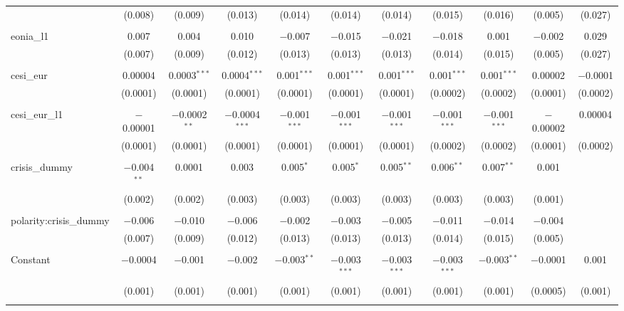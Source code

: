 \begin{table}[!htbp]
\begin{adjustbox}{width=1.35\textwidth}
\begin{tabular}{@{\extracolsep{5pt}}lcccccccccc}
  & (0.008) & (0.009) & (0.013) & (0.014) & (0.014) & (0.014) & (0.015) & (0.016) & (0.005) & (0.027) \\ 
  & & & & & & & & & & \\ 
 eonia\_l1 & 0.007 & 0.004 & 0.010 & $-$0.007 & $-$0.015 & $-$0.021 & $-$0.018 & 0.001 & $-$0.002 & 0.029 \\ 
  & (0.007) & (0.009) & (0.012) & (0.013) & (0.013) & (0.013) & (0.014) & (0.015) & (0.005) & (0.027) \\ 
  & & & & & & & & & & \\ 
 cesi\_eur & 0.00004 & 0.0003$^{***}$ & 0.0004$^{***}$ & 0.001$^{***}$ & 0.001$^{***}$ & 0.001$^{***}$ & 0.001$^{***}$ & 0.001$^{***}$ & 0.00002 & $-$0.0001 \\ 
  & (0.0001) & (0.0001) & (0.0001) & (0.0001) & (0.0001) & (0.0001) & (0.0002) & (0.0002) & (0.0001) & (0.0002) \\ 
  & & & & & & & & & & \\ 
 cesi\_eur\_l1 & $-$0.00001 & $-$0.0002$^{**}$ & $-$0.0004$^{***}$ & $-$0.001$^{***}$ & $-$0.001$^{***}$ & $-$0.001$^{***}$ & $-$0.001$^{***}$ & $-$0.001$^{***}$ & $-$0.00002 & 0.00004 \\ 
  & (0.0001) & (0.0001) & (0.0001) & (0.0001) & (0.0001) & (0.0001) & (0.0002) & (0.0002) & (0.0001) & (0.0002) \\ 
  & & & & & & & & & & \\ 
 crisis\_dummy & $-$0.004$^{**}$ & 0.0001 & 0.003 & 0.005$^{*}$ & 0.005$^{*}$ & 0.005$^{**}$ & 0.006$^{**}$ & 0.007$^{**}$ & 0.001 &  \\ 
  & (0.002) & (0.002) & (0.003) & (0.003) & (0.003) & (0.003) & (0.003) & (0.003) & (0.001) &  \\ 
  & & & & & & & & & & \\ 
 polarity:crisis\_dummy & $-$0.006 & $-$0.010 & $-$0.006 & $-$0.002 & $-$0.003 & $-$0.005 & $-$0.011 & $-$0.014 & $-$0.004 &  \\ 
  & (0.007) & (0.009) & (0.012) & (0.013) & (0.013) & (0.013) & (0.014) & (0.015) & (0.005) &  \\ 
  & & & & & & & & & & \\ 
 Constant & $-$0.0004 & $-$0.001 & $-$0.002 & $-$0.003$^{**}$ & $-$0.003$^{***}$ & $-$0.003$^{***}$ & $-$0.003$^{***}$ & $-$0.003$^{**}$ & $-$0.0001 & 0.001 \\ 
  & (0.001) & (0.001) & (0.001) & (0.001) & (0.001) & (0.001) & (0.001) & (0.001) & (0.0005) & (0.001) \\ 
  & & & & & & & & & & \\ 

\end{tabular}
\end{adjustbox}
\end{table}
